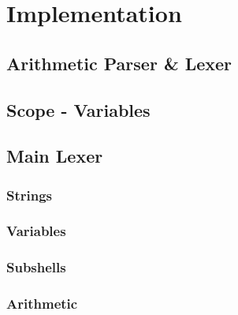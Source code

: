 \chapter{Implementation}




\section{Arithmetic Parser \& Lexer}

\section{Scope - Variables}

\section{Main Lexer}

\subsection{Strings}
\subsection{Variables}
\subsection{Subshells}
\subsection{Arithmetic}

